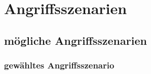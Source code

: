 \chapter{Angriffsszenarien}
\section{mögliche Angriffsszenarien}
\subsection{gewähltes Angriffsszenario}